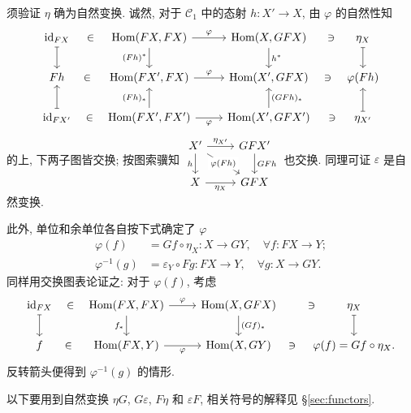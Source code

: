 须验证 $\eta$ 确为自然变换. 诚然, 对于 $\mathcal{C}_1$ 中的态射 $h: X' \to X$, 由 $\varphi$ 的自然性知
\[ \begin{tikzcd}
	\identity_{FX} \arrow[phantom, r, description, "\in"] \arrow[mapsto, d] & \Hom(FX, FX) \arrow[r, "\varphi"] \arrow[d, "(Fh)^*"'] & \Hom(X, GFX) \arrow[d, "h^*"] & \arrow[phantom, l, description, "\ni"] \eta_X \arrow[mapsto, d] \\
	Fh \arrow[phantom, r, description, "\in"] & \Hom(FX', FX) \arrow[r, "\varphi"] & \Hom(X', GFX) & \arrow[phantom, l, description, "\ni"] \varphi(Fh) \\
	\identity_{FX'} \arrow[phantom, r, description, "\in"] \arrow[mapsto, u] & \Hom(FX', FX') \arrow[u, "(Fh)_*"] \arrow[r, "\varphi"'] & \Hom(X', GFX') \arrow[u, "(GFh)_*"'] & \arrow[phantom, l, description, "\ni"] \eta_{X'} \arrow[mapsto, u]
\end{tikzcd} \]
的上, 下两子图皆交换; 按图索骥知
$\begin{tikzcd}
	X' \arrow[r, "\eta_{X'}"] \arrow[d, "h"'] \arrow[rd, "\varphi(Fh)" description] & GFX' \arrow[d, "GFh"] \\
	X \arrow[r, "\eta_X"'] & GFX
\end{tikzcd}$
也交换. 同理可证 $\varepsilon$ 是自然变换.

此外, 单位和余单位各自按下式确定了 $\varphi$
\begin{equation}\label{eqn:unit-adjunction}\begin{aligned}
	\varphi(f) & = Gf \circ \eta_X : X \to GY, \quad \forall f: FX \to Y ; \\
	\varphi^{-1}(g) & = \varepsilon_Y \circ Fg: FX \to Y , \quad \forall g: X \to GY.
\end{aligned}\end{equation}
同样用交换图表论证之: 对于 $\varphi(f)$, 考虑
\[ \begin{tikzcd}
	\identity_{FX} \arrow[phantom, r, description, "\in"] \arrow[mapsto, d] & \Hom(FX, FX) \arrow[r, "\varphi"] \arrow[d, "f_*"'] & \Hom(X, GFX) \arrow[d, "(Gf)_*"] & \arrow[phantom, l, description, "\ni"] \eta_X \arrow[mapsto, d] \\
	f \arrow[phantom, r, description, "\in"] & \Hom(FX, Y) \arrow[r, "\varphi"'] & \Hom(X, GY) & \arrow[phantom, l, description, "\ni"] \varphi(f) = Gf \circ \eta_X .
\end{tikzcd} \]
反转箭头便得到 $\varphi^{-1}(g)$ 的情形.

以下要用到自然变换 $\eta G$, $G\varepsilon$, $F\eta$ 和 $\varepsilon F$, 相关符号的解释见 \S\ref{sec:functors}.

